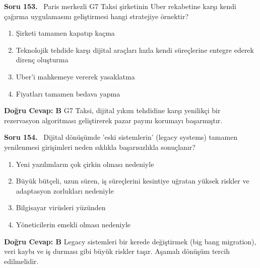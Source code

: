 \documentclass[11pt,a4paper,openany]{book}
\begin{document}
\needspace{5cm}
\vspace{8pt}
\noindent\textbf{\large\sffamily Soru 153.} \ Paris merkezli G7 Taksi şirketinin Uber rekabetine karşı kendi çağırma uygulamasını geliştirmesi hangi stratejiye örnektir?
\begin{enumerate}[label=\Alph*), leftmargin=25pt, topsep=4pt, itemsep=2pt]
    \item Şirketi tamamen kapatıp kaçma
    \item Teknolojik tehdide karşı dijital araçları hızla kendi süreçlerine entegre ederek direnç oluşturma
    \item Uber'i mahkemeye vererek yasaklatma
    \item Fiyatları tamamen bedava yapma
\end{enumerate}
\vspace{4pt}
\begin{tcolorbox}[title=Cevap ve Açıklama, colback=gray!3!white, colframe=primarycolor!90!black, arc=2mm, fonttitle=\bfseries\sffamily, top=6pt, bottom=6pt]
    \textbf{Doğru Cevap: B}
    \vspace{2pt}
    G7 Taksi, dijital yıkım tehdidine karşı yenilikçi bir rezervasyon algoritması geliştirerek pazar payını korumayı başarmıştır.
\end{tcolorbox}
\vspace{10pt}

\needspace{5cm}
\vspace{8pt}
\noindent\textbf{\large\sffamily Soru 154.} \ Dijital dönüşümde 'eski sistemlerin' (legacy systems) tamamen yenilenmesi girişimleri neden sıklıkla başarısızlıkla sonuçlanır?
\begin{enumerate}[label=\Alph*), leftmargin=25pt, topsep=4pt, itemsep=2pt]
    \item Yeni yazılımların çok çirkin olması nedeniyle
    \item Büyük bütçeli, uzun süren, iş süreçlerini kesintiye uğratan yüksek riskler ve adaptasyon zorlukları nedeniyle
    \item Bilgisayar virüsleri yüzünden
    \item Yöneticilerin emekli olması nedeniyle
\end{enumerate}
\vspace{4pt}
\begin{tcolorbox}[title=Cevap ve Açıklama, colback=gray!3!white, colframe=primarycolor!90!black, arc=2mm, fonttitle=\bfseries\sffamily, top=6pt, bottom=6pt]
    \textbf{Doğru Cevap: B}
    \vspace{2pt}
    Legacy sistemleri bir kerede değiştirmek (big bang migration), veri kaybı ve iş durması gibi büyük riskler taşır. Aşamalı dönüşüm tercih edilmelidir.
\end{tcolorbox}
\vspace{10pt}
\end{document}
